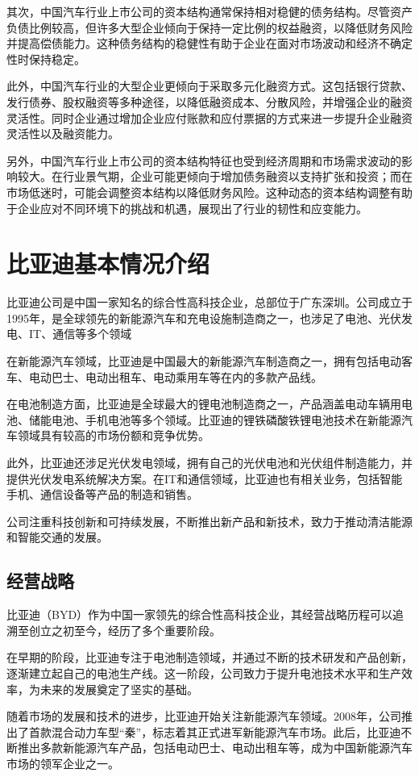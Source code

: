 其次，中国汽车行业上市公司的资本结构通常保持相对稳健的债务结构。尽管资产负债比例较高，但许多大型企业倾向于保持一定比例的权益融资，以降低财务风险并提高偿债能力。这种债务结构的稳健性有助于企业在面对市场波动和经济不确定性时保持稳定。

此外，中国汽车行业的大型企业更倾向于采取多元化融资方式。这包括银行贷款、发行债券、股权融资等多种途径，以降低融资成本、分散风险，并增强企业的融资灵活性。同时企业通过增加企业应付账款和应付票据的方式来进一步提升企业融资灵活性以及融资能力。

另外，中国汽车行业上市公司的资本结构特征也受到经济周期和市场需求波动的影响较大。在行业景气期，企业可能更倾向于增加债务融资以支持扩张和投资；而在市场低迷时，可能会调整资本结构以降低财务风险。这种动态的资本结构调整有助于企业应对不同环境下的挑战和机遇，展现出了行业的韧性和应变能力。

\section{比亚迪基本情况介绍}
比亚迪公司是中国一家知名的综合性高科技企业，总部位于广东深圳。公司成立于1995年，是全球领先的新能源汽车和充电设施制造商之一，也涉足了电池、光伏发电、IT、通信等多个领域

在新能源汽车领域，比亚迪是中国最大的新能源汽车制造商之一，拥有包括电动客车、电动巴士、电动出租车、电动乘用车等在内的多款产品线。

在电池制造方面，比亚迪是全球最大的锂电池制造商之一，产品涵盖电动车辆用电池、储能电池、手机电池等多个领域。比亚迪的锂铁磷酸铁锂电池技术在新能源汽车领域具有较高的市场份额和竞争优势。

此外，比亚迪还涉足光伏发电领域，拥有自己的光伏电池和光伏组件制造能力，并提供光伏发电系统解决方案。在IT和通信领域，比亚迪也有相关业务，包括智能手机、通信设备等产品的制造和销售。

公司注重科技创新和可持续发展，不断推出新产品和新技术，致力于推动清洁能源和智能交通的发展。
\subsection{经营战略}
比亚迪（BYD）作为中国一家领先的综合性高科技企业，其经营战略历程可以追溯至创立之初至今，经历了多个重要阶段。

在早期的阶段，比亚迪专注于电池制造领域，并通过不断的技术研发和产品创新，逐渐建立起自己的电池生产线。这一阶段，公司致力于提升电池技术水平和生产效率，为未来的发展奠定了坚实的基础。

随着市场的发展和技术的进步，比亚迪开始关注新能源汽车领域。2008年，公司推出了首款混合动力车型“秦”，标志着其正式进军新能源汽车市场。此后，比亚迪不断推出多款新能源汽车产品，包括电动巴士、电动出租车等，成为中国新能源汽车市场的领军企业之一。

